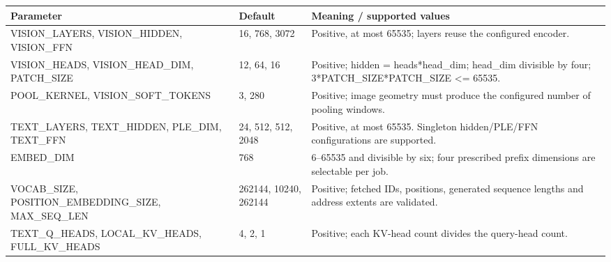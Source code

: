 \documentclass[11pt,a4paper]{article}
\begin{document}
{\small\renewcommand{\arraystretch}{1.18}\begin{longtable}{@{}L{0.22\textwidth}|L{0.21\textwidth}|L{0.49\textwidth}@{}}\toprule

\textbf{Parameter} & \textbf{Default} & \textbf{Meaning /\allowbreak{} supported values}\\\midrule\endhead

VISION\_\allowbreak{}LAYERS,\allowbreak{} VISION\_\allowbreak{}HIDDEN,\allowbreak{} VISION\_\allowbreak{}FFN & 16,\allowbreak{} 768,\allowbreak{} 3072 & Positive,\allowbreak{} at most 65535; layers reuse the configured encoder.\\[2pt]\hline

VISION\_\allowbreak{}HEADS,\allowbreak{} VISION\_\allowbreak{}HEAD\_\allowbreak{}DIM,\allowbreak{} PATCH\_\allowbreak{}SIZE & 12,\allowbreak{} 64,\allowbreak{} 16 & Positive; hidden =\allowbreak{} heads*\allowbreak{}head\_\allowbreak{}dim; head\_\allowbreak{}dim divisible by four; 3*\allowbreak{}PATCH\_\allowbreak{}SIZE*\allowbreak{}PATCH\_\allowbreak{}SIZE <=\allowbreak{} 65535.\\[2pt]\hline

POOL\_\allowbreak{}KERNEL,\allowbreak{} VISION\_\allowbreak{}SOFT\_\allowbreak{}TOKENS & 3,\allowbreak{} 280 & Positive; image geometry must produce the configured number of pooling windows.\\[2pt]\hline

TEXT\_\allowbreak{}LAYERS,\allowbreak{} TEXT\_\allowbreak{}HIDDEN,\allowbreak{} PLE\_\allowbreak{}DIM,\allowbreak{} TEXT\_\allowbreak{}FFN & 24,\allowbreak{} 512,\allowbreak{} 512,\allowbreak{} 2048 & Positive,\allowbreak{} at most 65535. Singleton hidden/\allowbreak{}PLE/\allowbreak{}FFN configurations are supported.\\[2pt]\hline

EMBED\_\allowbreak{}DIM & 768 & 6–65535 and divisible by six; four prescribed prefix dimensions are selectable per job.\\[2pt]\hline

VOCAB\_\allowbreak{}SIZE,\allowbreak{} POSITION\_\allowbreak{}EMBEDDING\_\allowbreak{}SIZE,\allowbreak{} MAX\_\allowbreak{}SEQ\_\allowbreak{}LEN & 262144,\allowbreak{} 10240,\allowbreak{} 262144 & Positive; fetched IDs,\allowbreak{} positions,\allowbreak{} generated sequence lengths and address extents are validated.\\[2pt]\hline

TEXT\_\allowbreak{}Q\_\allowbreak{}HEADS,\allowbreak{} LOCAL\_\allowbreak{}KV\_\allowbreak{}HEADS,\allowbreak{} FULL\_\allowbreak{}KV\_\allowbreak{}HEADS & 4,\allowbreak{} 2,\allowbreak{} 1 & Positive; each KV-head count divides the query-head count.\\[2pt]\hline


\end{longtable}}
\end{document}
